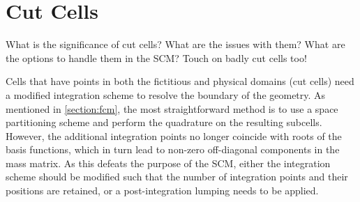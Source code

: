 %
\section{Cut Cells}
\label{section:cutcells}
%

What is the significance of cut cells?
What are the issues with them?
What are the options to handle them in the SCM?
Touch on badly cut cells too!

Cells that have points in both the fictitious and physical domains (cut cells)
need a modified integration scheme to resolve the boundary of the geometry. As
mentioned in \ref{section:fcm}, the most straightforward method is to use a
space partitioning scheme and perform the quadrature on the resulting subcells.
However, the additional integration points no longer coincide with roots of the
basis functions, which in turn lead to non-zero off-diagonal components in the
mass matrix. As this defeats the purpose of the SCM, either the integration
scheme should be modified such that the number of integration points and their
positions are retained, or a post-integration lumping needs to be applied.